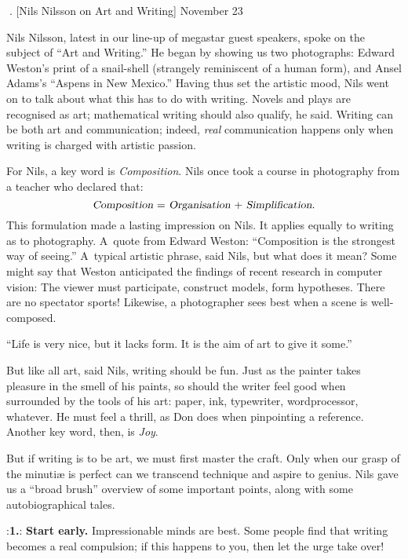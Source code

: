 \vfill\eject
. [Nils Nilsson on Art and Writing] \pmr November 23

Nils Nilsson, latest in our line-up of megastar guest speakers, spoke
on the subject of ``Art and Writing.'' He began by showing us two
photographs: Edward Weston's print of a snail-shell (strangely
reminiscent of a human form), and Ansel Adams's ``Aspens in New Mexico.''
Having thus set the artistic mood, Nils went on to talk about what
this has to do with writing. Novels and plays are recognised as art;
mathematical writing should also qualify, he said. Writing can be both
art and communication; indeed, {\it real\/} communication happens only
when writing is charged with artistic passion. 

For Nils, a key word is
{\it Composition}. Nils once took a course in photography from a
teacher who declared that:
$$\hbox{{\sl Composition $=$ Organisation $+$ Simplification}.}$$
This formulation made a lasting impression on Nils. It applies equally
to writing as to  photography. A~quote from Edward Weston:
``Composition is the strongest way of seeing.'' A~typical artistic
phrase, said Nils, but what does it mean?  Some might say that Weston
anticipated the findings of recent research in computer vision: The
viewer must participate, construct models, form hypotheses. There are
no spectator sports! Likewise, a photographer sees best when a scene
is well-composed.

{\obeylines
\qquad\qquad\qquad ``Life is very nice, but it lacks form.
\vskip -5pt
\qquad\qquad\qquad  \phantom{''}It is the aim of art to give it some.''
}

But like all art, said Nils, writing should be fun. Just as the
painter takes pleasure in the smell of his paints, so should the
writer feel good when surrounded by the tools of his art: paper, ink,
typewriter, wordprocessor, whatever. He must feel a thrill, as Don
does  when pinpointing a reference. Another key word, then, is {\it Joy}.

But if writing is to be art, we must first master the craft. Only when
our grasp of the minuti{\ae} is perfect can we transcend technique and
aspire to genius. Nils gave us a ``broad brush'' overview of some
important points, along with some autobiographical tales.

\smallskip
\display 20pt:{\bf 1.}:
{\bf Start early.} \quad Impressionable minds are best. Some people find
that writing becomes a real compulsion; if this happens to you, then
let the urge take over!

